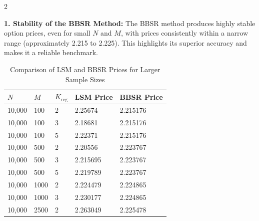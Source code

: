 \begin{multicols}{2}

\textbf{1. Stability of the BBSR Method:}  
The BBSR method produces highly stable option prices, even for small \(N\) and \(M\), with prices consistently within a narrow range (approximately 2.215 to 2.225). This highlights its superior accuracy and makes it a reliable benchmark.
\end{multicols}
\begin{table}[h!]
\centering
\caption{Comparison of LSM and BBSR Prices for Larger Sample Sizes}
\begin{tabular}{|p{1.5cm}|p{1.5cm}|p{1.5cm}|p{2.5cm}|p{2.5cm}|}
\hline
\textbf{\(N\)} & \textbf{\(M\)} & \textbf{\(K_{\text{reg}}\)} & \textbf{LSM Price} & \textbf{BBSR Price} \\ \hline
10,000 & 100  & 2 & 2.25674 & 2.215176 \\ \hline
10,000 & 100  & 3 & 2.18681 & 2.215176 \\ \hline
10,000 & 100  & 5 & 2.22371 & 2.215176 \\ \hline
10,000 & 500  & 2 & 2.20556 & 2.223767 \\ \hline
10,000 & 500  & 3 & 2.215695 & 2.223767 \\ \hline
10,000 & 500  & 5 & 2.219789 & 2.223767 \\ \hline
10,000 & 1000 & 2 & 2.224479 & 2.224865 \\ \hline
10,000 & 1000 & 3 & 2.230177 & 2.224865 \\ \hline
10,000 & 2500 & 2 & 2.263049 & 2.225478 \\ \hline
\end{tabular}
\label{tab:LSM_vs_BBSR_2}
\end{table}


